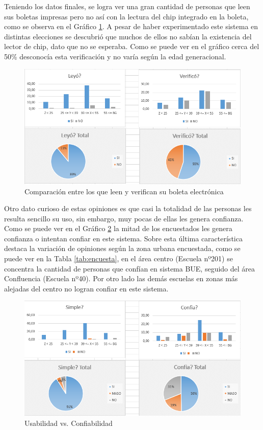 Teniendo los datos finales, se logra ver una gran cantidad de personas que leen sus boletas impresas pero no así con la lectura del chip integrado en la boleta, como se observa en el Gráfico \ref{graf:votantes}. A pesar de haber experimentado este sistema en distintas elecciones se descubrió que muchos de ellos no sabían la existencia del lector de chip, dato que no se esperaba. Como se puede ver en el gráfico cerca del 50\% desconocía esta verificación y no varía según la edad generacional.

\begin{figure}[h!]
  \includegraphics[width=\textwidth]{img/yfrjnCosp0.png}
  \caption{Comparación entre los que leen y verifican su boleta electrónica}
  \label{graf:votantes}
\end{figure}

Otro dato curioso de estas opiniones es que casi la totalidad de las personas les resulta sencillo su uso, sin embargo, muy pocas de ellas les genera confianza. Como se puede ver en el Gráfico \ref{graf:votantesUsoConfia} la mitad de los encuestados les genera confianza o intentan confiar en este sistema. Sobre esta última característica destaca la variación de opiniones según la zona urbana encuestada, como se puede ver en la Tabla \ref{tab:encuesta}, en el área centro (Escuela nº201)  se concentra la cantidad de personas que confían en sistema BUE, seguido del área Confluencia (Escuela nº40). %
Por otro lado las demás escuelas en zonas más alejadas del centro no logran confiar en este sistema. 
\begin{figure}[h!]
  \includegraphics[width=\textwidth]{img/SLLXOorTia.png}
  \caption{Usabilidad vs. Confiabilidad}
  \label{graf:votantesUsoConfia}
\end{figure}

